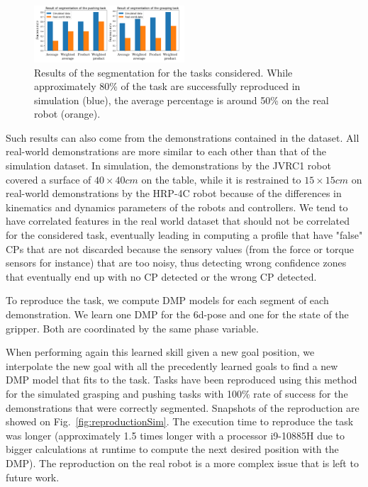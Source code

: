 \documentclass[conference]{IEEEtran}
\begin{document}
\begin{figure}[t]
  \centering
  \includegraphics[width=0.5\textwidth]{img/results_segmentation.pdf}
  \caption{Results of the segmentation for the tasks considered. While approximately 80\% of the task are successfully reproduced in simulation (blue), the average percentage is around 50\% on the real robot (orange).}
  \label{fig:resultsSeg}
\end{figure}

Such results can also come from the demonstrations contained in the dataset. All real-world demonstrations are more similar to each other than that of the simulation dataset. In simulation, the demonstrations by the JVRC1 robot covered a surface of $40 \times 40 cm$ on the table, while it is restrained to $15 \times 15 cm$ on real-world demonstrations by the HRP-4C robot because of the differences in kinematics and dynamics parameters of the robots and controllers. We tend to have correlated features in the real world dataset that should not be correlated for the considered task, eventually leading in computing a profile that have "false" CPs that are not discarded because the sensory values (from the force or torque sensors for instance) that are too noisy, thus detecting wrong confidence zones that eventually end up with no CP detected or the wrong CP detected.

To reproduce the task, we compute DMP models for each segment of each demonstration. We learn one DMP for the 6d-pose and one for the state of the gripper. Both are coordinated by the same phase variable.

When performing again this learned skill given a new goal position, we interpolate the new goal with all the precedently learned goals to find a new DMP model that fits to the task. Tasks have been reproduced using this method for the simulated grasping and pushing tasks with 100\% rate of success for the demonstrations that were correctly segmented. Snapshots of the reproduction are showed on Fig.~\ref{fig:reproductionSim}. The execution time to reproduce the task was longer (approximately 1.5 times longer with a processor i9-10885H due to bigger calculations at runtime to compute the next desired position with the DMP). The reproduction on the real robot is a more complex issue that is left to future work. 
\end{document}

